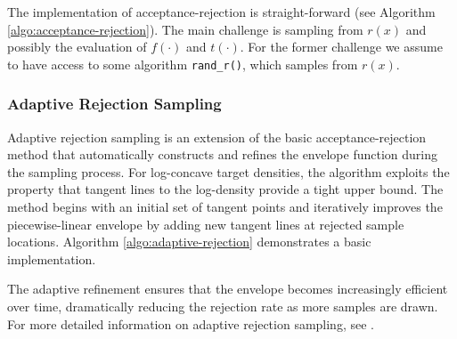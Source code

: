 The implementation of acceptance-rejection is straight-forward (see Algorithm \ref{algo:acceptance-rejection}). The main challenge is sampling from $r(x)$ and possibly the evaluation of $f(\cdot)$ and $t(\cdot)$. For the former challenge we assume to have access to some algorithm \texttt{rand\_r()}, which samples from $r(x)$.

\subsubsection{Adaptive Rejection Sampling}
Adaptive rejection sampling is an extension of the basic acceptance-rejection method that automatically constructs and refines the envelope function during the sampling process. For log-concave target densities, the algorithm exploits the property that tangent lines to the log-density provide a tight upper bound. The method begins with an initial set of tangent points and iteratively improves the piecewise-linear envelope by adding new tangent lines at rejected sample locations. Algorithm \ref{algo:adaptive-rejection} demonstrates a basic implementation. 

The adaptive refinement ensures that the envelope becomes increasingly efficient over time, dramatically reducing the rejection rate as more samples are drawn. For more detailed information on adaptive rejection sampling, see \cite{murphy_probabilistic_2023}.
